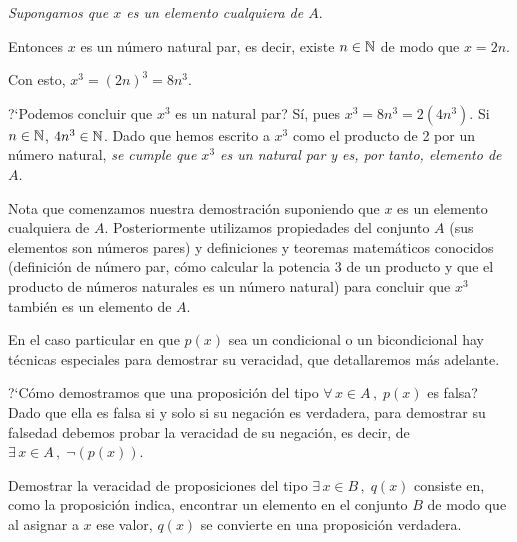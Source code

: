 \begin{enumerate}
		\medskip 
		
			{\em Supongamos que $x$ es un elemento cualquiera de $A$}.
			
			Entonces $x$ es un n\'umero natural par, es decir, existe
			$n \in \mathbb{N}$ de modo que $x = 2n$.
			
			Con esto, $x^3 = (2n)^3 = 8n^3$.
			
			?`Podemos concluir que $x^3$ es un natural par? S\'i, pues
			$x^3 = 8n^3 = 2(4n^3)$. Si $n\in \mathbb{N}$, $4n^3 \in \mathbb{N}$.
			Dado que hemos
			escrito a $x^3$ como el producto de 2 por un n\'umero natural,
			{\em se cumple que $x^3$ es un natural par y es, por tanto,
			elemento de $A$}.
			
		\medskip 
		
		Nota que comenzamos nuestra demostraci\'on suponiendo
		que $x$ es un elemento cualquiera de $A$. Posteriormente
		utilizamos propiedades del conjunto $A$ (sus elementos
		son n\'umeros pares) y definiciones y teoremas matem\'aticos
		conocidos (definici\'on de n\'umero par, c\'omo
		calcular la potencia 3 de un
		producto y que el producto de n\'umeros naturales es
		un n\'umero natural) 
		para concluir que $x^3$ tambi\'en es un elemento de $A$.
		
		En el caso particular en que $p(x)$ sea un condicional o un
		bicondicional hay t\'ecnicas especiales para demostrar
		su veracidad, que detallaremos m\'as adelante.
\end{enumerate}

?`C\'omo demostramos que una proposici\'on del tipo
$\forall\, x \in A\, ,\; p(x)$ es falsa? 
Dado que ella es falsa si y solo si su negaci\'on
es verdadera, para demostrar su falsedad debemos
probar la veracidad de su negaci\'on, es decir, 
de $\exists\, x \in A\, ,\; 
\neg(p(x))$.

Demostrar la veracidad de proposiciones del tipo
$\exists\,x \in B\, ,\; q(x)$ consiste en, como
la proposici\'on indica, encontrar un elemento
en el conjunto $B$ de modo que al asignar a $x$ ese
valor, $q(x)$ se convierte en una proposici\'on verdadera.

